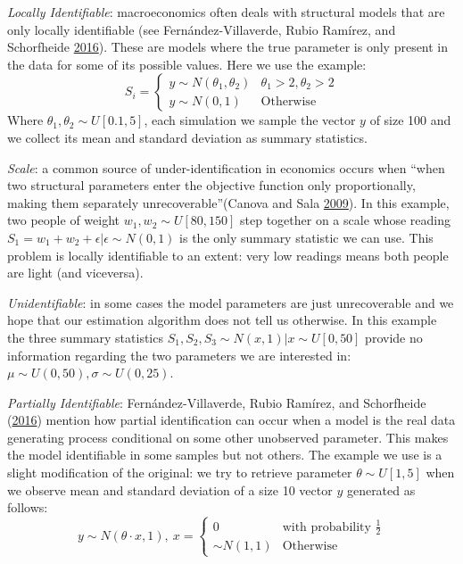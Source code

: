 \documentclass[]{article}
\begin{document}
\emph{Locally Identifiable}: macroeconomics often deals with structural models that are only locally identifiable (see Fernández-Villaverde, Rubio Ramírez, and Schorfheide \protect\hyperlink{ref-Fernandez-Villaverde2015}{2016}). These are models where the true parameter is only present in the data for some of its possible values. Here we use the example:
\[
S_i=\left\{\begin{matrix}
y \sim N(\theta_1,\theta_2) & \theta_1>2, \theta_2>2\\ 
y \sim N(0,1)  &  \text{Otherwise}
\end{matrix}\right. \label{eq:local}  
\]
Where \(\theta_1,\theta_2 \sim U[0.1,5]\), each simulation we sample the vector \(y\) of size 100 and we collect its mean and standard deviation as summary statistics.

\emph{Scale}: a common source of under-identification in economics occurs when ``when two structural parameters enter the objective function only proportionally, making them separately unrecoverable''(Canova and Sala \protect\hyperlink{ref-Canova2005}{2009}).
In this example, two people of weight \(w_1,w_2\sim U[80,150]\) step together on a scale whose reading \(S_1 = w_1 + w_2 + \epsilon | \epsilon \sim N(0,1)\) is the only summary statistic we can use.
This problem is locally identifiable to an extent: very low readings means both people are light (and viceversa).

\emph{Unidentifiable}: in some cases the model parameters are just unrecoverable and we hope that our estimation algorithm does not tell us otherwise.
In this example the three summary statistics \(S_1,S_2,S_3 \sim N(x,1)| x \sim U[0,50]\) provide no information regarding the two parameters we are interested in: \(\mu\sim U(0,50), \sigma \sim U(0,25)\).

\emph{Partially Identifiable}: Fernández-Villaverde, Rubio Ramírez, and Schorfheide (\protect\hyperlink{ref-Fernandez-Villaverde2015}{2016}) mention how partial identification can occur when a model is the real data generating process conditional on some other unobserved parameter. This makes the model identifiable in some samples but not others. The example we use is a slight modification of the original: we try to retrieve parameter \(\theta \sim U[1,5]\) when we observe mean and standard deviation of a size 10 vector \(y\) generated as follows:
\[
y \sim N(\theta\cdot x,1), ~
x=\left\{\begin{matrix}
0 & \text{with probability } \frac 1 2\\ 
 \sim N(1,1)  &  \text{Otherwise}
\end{matrix}\right. \label{eq:partial}  
\]
\end{document}
